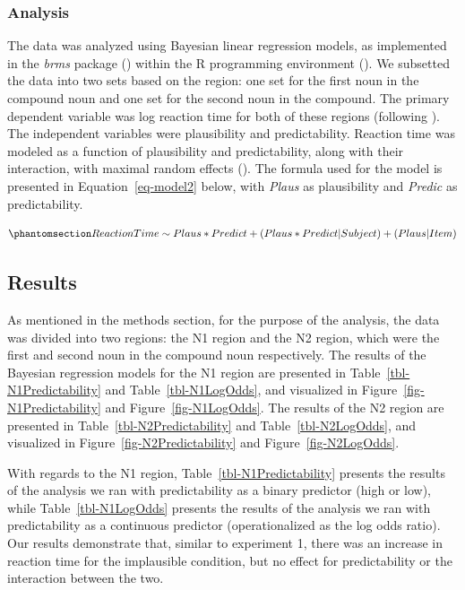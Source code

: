 \documentclass[
  12pt,
  letterpaper,
]{scrreprt}
\begin{document}
\subsubsection{Analysis}\label{analysis-1}

The data was analyzed using Bayesian linear regression models, as
implemented in the \emph{brms} package
() within
the R programming environment (). We subsetted the data into two sets based on the region: one set
for the first noun in the compound noun and one set for the second noun
in the compound. The primary dependent variable was log reaction time
for both of these regions (following
). The
independent variables were plausibility and predictability. Reaction
time was modeled as a function of plausibility and predictability, along
with their interaction, with maximal random effects
(). The
formula used for the model is presented in Equation~\ref{eq-model2}
below, with \emph{Plaus} as plausibility and \emph{Predic} as
predictability.

\begin{equation}\phantomsection\label{eq-model2}{
Reaction Time\sim Plaus*Predict+(Plaus*Predict|Subject)+(Plaus|Item) 
}\end{equation}

\subsection{Results}\label{results-1}

As mentioned in the methods section, for the purpose of the analysis,
the data was divided into two regions: the N1 region and the N2 region,
which were the first and second noun in the compound noun respectively.
The results of the Bayesian regression models for the N1 region are
presented in Table~\ref{tbl-N1Predictability} and
Table~\ref{tbl-N1LogOdds}, and visualized in
Figure~\ref{fig-N1Predictability} and Figure~\ref{fig-N1LogOdds}. The
results of the N2 region are presented in
Table~\ref{tbl-N2Predictability} and Table~\ref{tbl-N2LogOdds}, and
visualized in Figure~\ref{fig-N2Predictability} and
Figure~\ref{fig-N2LogOdds}.

With regards to the N1 region, Table~\ref{tbl-N1Predictability} presents
the results of the analysis we ran with predictability as a binary
predictor (high or low), while Table~\ref{tbl-N1LogOdds} presents the
results of the analysis we ran with predictability as a continuous
predictor (operationalized as the log odds ratio). Our results
demonstrate that, similar to experiment 1, there was an increase in
reaction time for the implausible condition, but no effect for
predictability or the interaction between the two.
\end{document}
